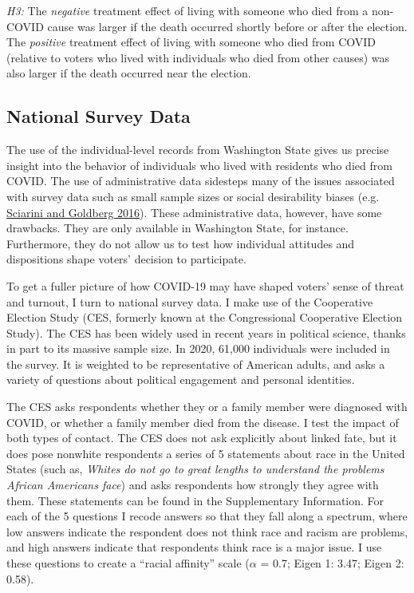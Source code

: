\documentclass[
  12pt,
]{article}
\begin{document}
\emph{H3:} The \emph{negative} treatment effect of living with someone who died from a non-COVID cause was larger if the death occurred shortly before or after the election. The \emph{positive} treatment effect of living with someone who died from COVID (relative to voters who lived
with individuals who died from other causes) was also larger if the death occurred near the election.

\hypertarget{national-survey-data}{%
\subsection*{National Survey Data}\label{national-survey-data}}

The use of the individual-level records from Washington State gives us precise insight into the behavior of individuals who lived with residents who died from COVID. The use of administrative data sidesteps many of the issues associated with survey data such as small sample sizes or social desirability biases (e.g. \protect\hyperlink{ref-Sciarini2016}{Sciarini and Goldberg 2016}). These administrative data, however, have some drawbacks. They are only available in Washington State, for instance. Furthermore, they do not allow us to test how individual attitudes and dispositions shape voters' decision to participate.

To get a fuller picture of how COVID-19 may have shaped voters' sense of threat and turnout, I turn to national survey data. I make use of the Cooperative Election Study (CES, formerly known at the Congressional Cooperative Election Study). The CES has been widely used in recent years in political science, thanks in part to its massive sample size. In 2020, 61,000 individuals were included in the survey. It is weighted to be representative of American adults, and asks a variety of questions about political engagement and personal identities.

The CES asks respondents whether they or a family member were diagnosed with COVID, or whether a family member died from the disease. I test the impact of both types of contact. The CES does not ask explicitly about linked fate, but it does pose nonwhite respondents a series of 5 statements about race in the United States (such as, \emph{Whites do not go to great lengths to understand the problems African Americans face}) and asks respondents how strongly they agree with them. These statements can be found in the Supplementary Information. For each of the 5 questions I recode answers so that they fall along a spectrum, where low answers indicate the respondent does not think race and racism are problems, and high answers indicate that respondents think race is a major issue. I use these questions to create a ``racial affinity'' scale (\(\alpha\) = 0.7; Eigen 1: 3.47; Eigen 2: 0.58).
\end{document}
